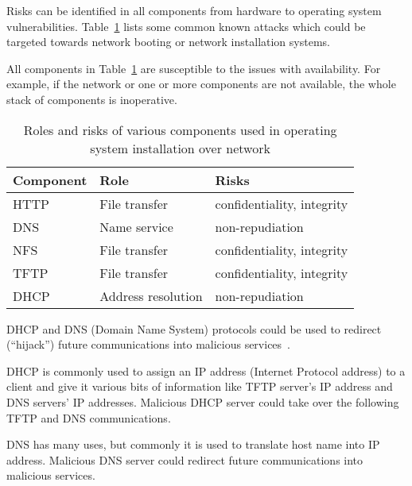 Risks can be identified in all components from hardware to operating
system vulnerabilities. Table~\ref{tab:risks_table} lists some
common known attacks which could be targeted towards network booting
or network installation systems.

All components in Table~\ref{tab:risks_table} are susceptible to the
issues with availability. For example, if the network or one or more
components are not available, the whole stack of components is
inoperative.

\begin{table}[!ht]
  \def\arraystretch{1.1}%
  \begin{center}
    \caption{Roles and risks of various components used in operating
      system installation over network\label{tab:risks_table}}
    \begin{tabular}{| l | l | l |}
      \hline
      Component   & Role               & Risks                      \\
      \hline
      HTTP        & File transfer      & confidentiality, integrity \\
      DNS         & Name service       & non-repudiation            \\
      NFS         & File transfer      & confidentiality, integrity \\
      TFTP        & File transfer      & confidentiality, integrity \\
      DHCP        & Address resolution & non-repudiation            \\
      \hline
    \end{tabular}
  \end{center}
\end{table}


DHCP and DNS (Domain Name System) protocols could be used to redirect
(``hijack'') future communications into malicious
services~\cite{green2005dns}\cite{ornaghi2003man}.

DHCP is commonly used to assign an IP address (Internet Protocol
address) to a client and give it various bits of information like TFTP
server's IP address and DNS servers' IP addresses. Malicious DHCP
server could take over the following TFTP and DNS communications.

DNS has many uses, but commonly it is used to translate host name into
IP address. Malicious DNS server could redirect future communications
into malicious services.

